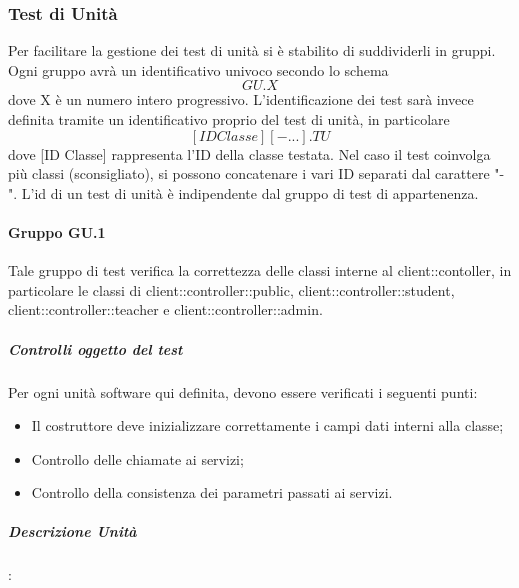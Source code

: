 \documentclass[12pt,a4paper]{article}
\begin{document}
\subsubsection{Test di Unità}\label{test_unita}
Per facilitare la gestione dei test di unità si è stabilito di suddividerli in gruppi. Ogni gruppo avrà un identificativo univoco secondo lo schema
\[ GU.X  \]
dove X è un numero intero progressivo. 
L'identificazione dei test sarà invece definita tramite un identificativo proprio del test di unità, in particolare
\[ [ID Classe][- ...].TU \] 
dove [ID Classe] rappresenta l'ID della classe testata. Nel caso il test coinvolga più classi (sconsigliato), si possono concatenare i vari ID separati dal carattere "-".
L'id di un test di unità è indipendente dal gruppo di test di appartenenza.
\paragraph{Gruppo GU.1}
Tale gruppo di test verifica la correttezza delle classi interne al  client::contoller, in particolare le classi di client::controller::public, client::controller::student, client::controller::teacher e client::controller::admin.
\subparagraph{Controlli oggetto del test}
Per ogni unità software qui definita, devono essere verificati i seguenti punti:
\begin{itemize}
	\item Il costruttore deve inizializzare correttamente i campi dati interni alla classe;
	\item Controllo delle chiamate ai servizi;
	\item Controllo della consistenza dei parametri passati ai servizi.
\end{itemize}
\subparagraph{Descrizione Unità}:
\end{document}
